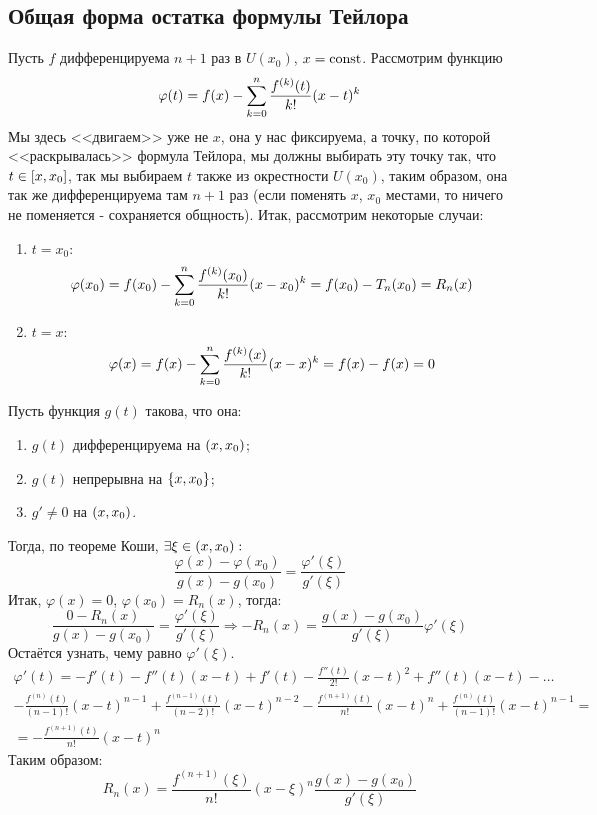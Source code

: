 \subsection{Общая форма остатка формулы Тейлора}
Пусть \( f \) дифференцируема \( n + 1 \) раз в \( U(x_0) \), \( x = \text{const} \).
Рассмотрим функцию \begin{equation} \label{PhiRnFunct}
\varphi (t) = f(x) - \sum \limits_{k=0}^{n} {\frac{f^{(k)}(t)}{k!}(x-t)^k}
\end{equation} Мы здесь <<двигаем>> уже не \( x \), она у нас фиксируема, а точку, по которой <<раскрывалась>> формула Тейлора, мы должны выбирать эту точку так, что \( t \in \left[ x, x_0 \right] \), так мы выбираем \( t \) также из окрестности \( U(x_0) \), таким образом, она так же дифференцируема там \( n + 1 \) раз (если поменять \( x \), \( x_0 \) местами, то ничего не поменяется - сохраняется общность).
Итак, рассмотрим некоторые случаи:
\begin{enumerate}
    \item \( t = x_0 \colon\)
    \[ \varphi (x_0) = f(x_0) - \sum \limits_{k=0}^{n} {\frac{f^{(k)}(x_0)}{k!}(x-x_0)^k} = f(x_0) - T_n(x_0) = R_n(x) \]
    \item \( t = x \colon\)
    \[ \varphi (x) = f(x) - \sum \limits_{k=0}^{n} {\frac{f^{(k)}(x)}{k!}(x-x)^k} = f(x) - f(x) = 0\]
\end{enumerate}
Пусть функция \( g(t) \) такова, что она: 
\begin{enumerate} 
    \item \( g(t) \) дифференцируема на \( \left( x, x_0 \right) \);
    \item \( g(t) \) непрерывна на \( \left\{ x, x_0 \right\} \);
    \item \( g' \not= 0 \) на \( \left( x, x_0 \right) \).
\end{enumerate}
Тогда, по теореме Коши, \( \exists \xi \in \left( x, x_0 \right) \colon \)
\[ \frac{\varphi (x) - \varphi (x_0)}{g(x) - g(x_0)} = \frac{\varphi'(\xi)}{g'(\xi)} \]
Итак, \( \varphi(x) = 0 \), \( \varphi(x_0) = R_n(x) \), тогда:
\[ \frac{0 - R_n(x)}{g(x) - g(x_0)} = \frac{\varphi'(\xi)}{g'(\xi)} \Longrightarrow -R_n(x) = \frac{g(x) - g(x_0)}{g'(\xi)}\varphi'(\xi) \]
Остаётся узнать, чему равно \( \varphi'(\xi) \).
\begin{multline*}
    \varphi'(t) = -f'(t) - f''(t)(x-t) + f'(t) - \frac{f''(t)}{2!}(x-t)^2 + f''(t)(x-t) - \dots \\ 
    - \frac{f^{(n)}(t)}{(n-1)!}(x-t)^{n-1} + \frac{f^{(n-1)}(t)}{(n-2)!}(x-t)^{n-2} - \frac{f^{(n+1)}(t)}{n!}(x-t)^{n} + \frac{f^{(n)}(t)}{(n-1)!}(x-t)^{n-1} = \\
    = -\frac{f^{(n+1)}(t)}{n!}(x-t)^{n}
\end{multline*}
Таким образом:
\begin{equation} \label{genFormRn}
    R_n(x) = \frac{f^{(n+1)}(\xi)}{n!}(x-\xi)^{n}\frac{g(x) - g(x_0)}{g'(\xi)}
\end{equation}